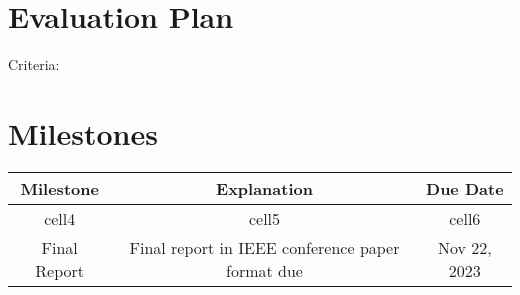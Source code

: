 \documentclass[10pt]{article}
\begin{document}
\section{Evaluation Plan}
   Criteria:
    
\section{Milestones} %


\begin{center}
\begin{tabular}{ |c|c|c| }
\hline
 Milestone & Explanation & Due Date \\ \hline
 cell4 & cell5 & cell6 \\  
 Final Report & Final report in IEEE conference paper format due & Nov 22, 2023   \\
 \hline
\end{tabular}
\end{center}



\end{document}
